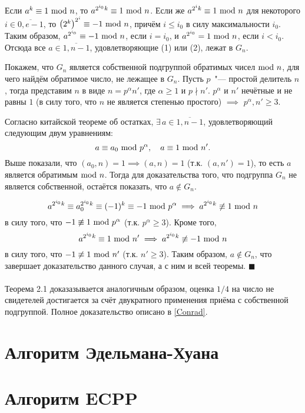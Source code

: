 \documentclass[12pt]{article}
\theoremstyle{definition}
\numberwithin{Def}{section}
\numberwithin{Th}{section}
\numberwithin{St}{section}
\newenvironment{Proof}                    
        {\par\noindent{\bf Доказательство.}}
        {\hfill$\scriptstyle\blacksquare$}
\begin{document}
\begin{Proof}
	Если $a^k\equiv 1\ \mathrm{mod}\ n$, то $a^{2^{i_0}k}\equiv 1\ \mathrm{mod}\ n$. Если же
	$a^{2^ik}\equiv 1\ \mathrm{mod}\ n$ для некоторого $i\in\overline{0,e-1}$, то
	$\left(2^k\right)^{2^i}\equiv-1\ \mathrm{mod}\ n$, причём $i\leqslant i_0$ в силу
	максимальности $i_0$. Таким образом, $a^{2^{i_0}}\equiv -1\ \mathrm{mod}\ n$, если
	$i=i_0$, и $a^{2^{i_0}}=1\ \mathrm{mod}\ n$, если $i<i_0$. Отсюда все
	$a\in\overline{1,n-1}$, удовлетворяющие (1) или (2), лежат в $G_n$.
	
	Покажем, что $G_n$ является собственной подгруппой обратимых чисел$\ \mathrm{mod}\ n$,
	для чего найдём обратимое число, не лежащее в $G_n$. Пусть $p$~"--- простой
	делитель $n$, тогда представим $n$ в виде $n=p^\alpha n'$, где
	$\alpha\geqslant 1$ и $p\nmid n'$. $p^\alpha$ и $n'$ нечётные и не равны $1$
	(в силу того, что $n$ не является степенью простого) $\implies$
	$p^\alpha,n'\geqslant 3$.
	
	Согласно китайской теореме об остатках, $\exists\,a\in\overline{1,n-1}$,
	удовлетворяющий следующим двум уравнениям:
	$$
	a\equiv a_0\ \mathrm{mod}\ p^\alpha, \quad a\equiv 1\ \mathrm{mod}\ n'. 
	$$
	Выше показали, что $(a_0,n)=1\implies (a,n)=1$ (т.к. $(a,n')=1$), то есть
	$a$ является обратимым$\ \mathrm{mod}\ n$. Тогда для доказательства того, что подгруппа
	$G_n$ не является собственной, остаётся показать, что $a\notin G_n$.
	
	$$
	a^{2^{i_0}k}\equiv a^{2^{i_0}k}_0 \equiv (-1)^k\equiv -1\ \mathrm{mod}\ p^\alpha
	\implies a^{2^{i_0}k}\not\equiv 1\ \mathrm{mod}\ n
	$$
	в силу того, что $-1\not\equiv 1\ \mathrm{mod}\ p^\alpha$ (т.к. $p^\alpha\geqslant 3$).
	Кроме того,
	$$
	a^{2^{i_0}k}\equiv 1\ \mathrm{mod}\ n'\implies a^{2^{i_0}k}\not\equiv -1\ \mathrm{mod}\ n
	$$
	в силу того, что $-1\not\equiv 1\ \mathrm{mod}\ n'$ (т.к. $n'\geqslant 3$). Таким
	образом, $a\notin G_n$, что завершает доказательство данного случая, а с ним
	и всей теоремы.
\end{Proof}
\\\\
Теорема 2.1 доказазывается аналогичным образом, оценка $1/4$ на число
не свидетелей достигается за счёт двукратного применения приёма с собственной
подгруппой. Полное доказательство описано в \ref{Conrad}.

\section{Алгоритм Эдельмана-Хуана}

\section{Алгоритм ECPP}
\end{document}
